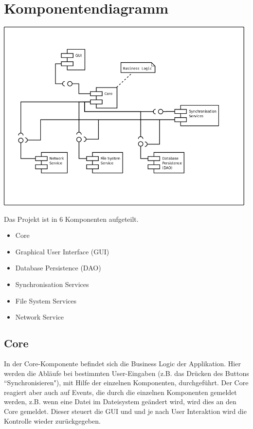\section{Komponentendiagramm}

\includegraphics[width=0.98\textwidth]{../uml/component_diagram.png}

Das Projekt ist in 6 Komponenten aufgeteilt. 
\begin{itemize}
	\item Core
	\item Graphical User Interface (GUI)
	\item Database Persistence (DAO)
	\item Synchronisation Services
	\item File System Services
	\item Network Service
\end{itemize}



\subsection{Core}
In der Core-Komponente befindet sich die Business Logic der Applikation. Hier werden die Abläufe bei bestimmten User-Eingaben (z.B. das Drücken des Buttons ``Synchronisieren"), mit Hilfe der einzelnen Komponenten, durchgeführt. 
Der Core reagiert aber auch auf Events, die durch die einzelnen Komponenten gemeldet werden, z.B. wenn eine Datei im Dateisystem geändert wird, wird dies an den Core gemeldet. Dieser steuert die GUI und und je nach User Interaktion wird die Kontrolle wieder zurückgegeben. 

